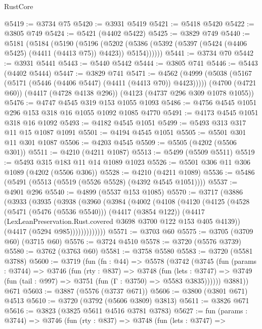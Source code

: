 \begin{lexlean}{RustCore}
\begin{coremodule}
@5419 := @3734 @75
@5420 := @3931 @5419
@5421 := @5418 @5420
@5422 := @3805 @749
@5424 := @5421 (@4402 @5422)
@5425 := @3829 @749
@5440 := @5181
    (@5184
      (@5190
        (@5196
          (@5202 (@5386 (@5392 (@5397 (@5424 (@4406 @5425) (@4411 (@4413 @75)) @4423)) @5154))))))
@5441 := @3734 @70
@5442 := @3931 @5441
@5443 := @5440 @5442
@5444 := @3805 @741
@5446 := @5443 (@4402 @5444)
@5447 := @3829 @741
@5471 := @4562
    (@4999 (@5038 (@5167 (@5171 (@5446 (@4406 @5447) (@4411 (@4413 @70)) @4423)))))
    (@4700 (@4721 @60))
    (@4417 (@4728 @4138 @296))
    (@4123 (@4737 @296 @309 @1078 @1055))
@5476 := @4747 @4545 @319 @153 @1055 @1093
@5486 := @4756 @4545 @1051 @296 @153 @318 @16 @1055 @1092 @1085 @4770
@5491 := @4173 @4545 @1051 @318 @16 @1092
@5493 := @4182 @4545 @1051
@5499 := @5493 @313 @317 @11 @15 @1087 @1091
@5501 := @4194 @4545 @1051
@5505 := @5501 @301 @11 @301 @1087
@5506 := @4203 @4545
@5509 := @5505 (@4202 (@5506 @301))
@5511 := @4210 (@4211 @1087)
@5513 := @5499 (@5509 @5511)
@5519 := @5493 @315 @183 @11 @14 @1089 @1023
@5526 := @5501 @306 @11 @306 @1089 (@4202 (@5506 @306))
@5528 := @4210 (@4211 @1089)
@5536 := @5486 (@5491 (@5513 (@5519 (@5526 @5528) (@4392 @4545 @1051))))
@5537 := @4901 @296
@5540 := @4899 (@5537 @153 @1085)
@5570 := @3717
    (@3886
      (@3933
        (@3935
          (@3938
            (@3960
              (@3984
                (@4002
                  (@4108
                    (@4120
                      (@4125
                        (@4528
                          (@5471 (@5476 (@5536 @5540)))
                          (@4417 (@3854 @122))
                          (@4417
                            (LexLeanPreservation.Rust.covered @3698 @3700 @122 @153 @405 @4139))
                          (@4417 (@5294 @985)))))))))))))
@5571 := @3703 @60
@5575 := @3705 (@3709 @60) (@3715 @60)
@5576 := @3724 @4510
@5578 := @3720 (@5576 @3739)
@5580 := @3762 (@3763 @60)
@5581 := @3758 @5580
@5583 := @3720 (@5581 @3788)
@5600 := @3719
    (fun (fn : @44) =>
    @5578
      (@3742
        (@3745
          (fun (params : @3744) =>
          @3746
            (fun (rty : @837) =>
            @3748
              (fun (lets : @3747) =>
              @3749 (fun (tail : @997) => @3751 (fun (Γ : @3750) => @5583 @3835))))))
        @3881))
    @671
@5603 := @3887 (@5576 (@3737 @671))
@5606 := @3800 (@3801 @671) @4513
@5610 := @3720 (@3792 (@5606 @3809) @3813)
@5611 := @3826 @671
@5616 := @3823 (@3825 @5611 @4516 @3781 @3783)
@5627 := fun (params : @3744) =>
  @3746
    (fun (rty : @837) =>
    @3748
      (fun (lets : @3747) =>

\end{coremodule}
\end{lexlean}
